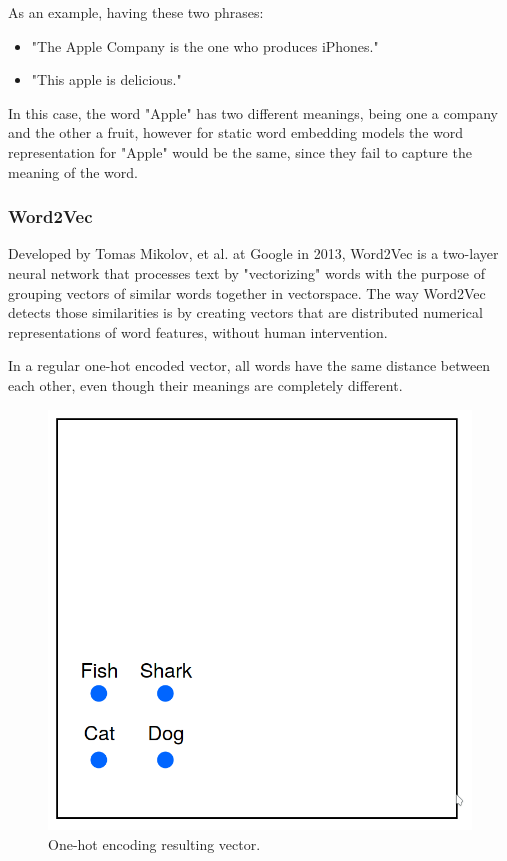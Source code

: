    \par As an example, having these two phrases:

    \begin{itemize}
        \item "The Apple Company is the one who produces iPhones."
        \item "This apple is delicious."
    \end{itemize}

    \par In this case, the word "Apple" has two different meanings, being one a company and the other a fruit, however for static word embedding models the word representation for "Apple" would be the same, since they fail to capture the meaning of the word. \cite{Batista2018}

   
        \subsubsection{Word2Vec}

        \par Developed by Tomas Mikolov, et al. at Google in 2013, Word2Vec is a two-layer neural network that processes text by "vectorizing" words with the purpose of grouping vectors of similar words together in vectorspace. The way Word2Vec detects those similarities is by creating vectors that are distributed numerical representations of word features, without human intervention.


        \par In a regular one-hot encoded vector, all words have the same distance between each other, even though their meanings are completely different.

        \begin{figure}[htb]
            \centering
            \includegraphics[scale = 0.1]{Sections/3StateOfTheArt/3_images/one_hot_ex.png}
            \caption{One-hot encoding resulting vector. \cite{word2vec_explained}} 
        \end{figure}


